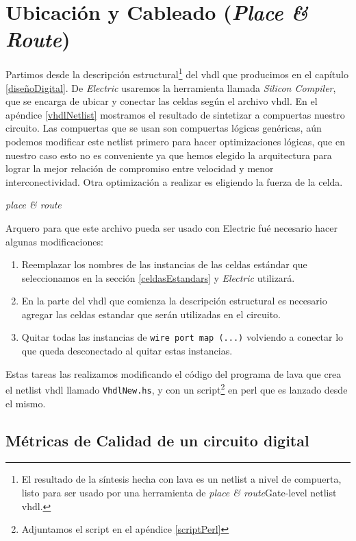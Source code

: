  


\section{Ubicación y Cableado (\emph{Place \& Route})}
Partimos desde la descripción estructural\footnote{El resultado de la síntesis hecha con lava es un netlist a nivel de compuerta, listo para ser usado por una herramienta de \emph{place \& route}Gate-level netlist vhdl.} del vhdl que producimos en el capítulo \ref{diseñoDigital}. De \emph{Electric} usaremos la herramienta llamada \emph{Silicon Compiler}, que se encarga de ubicar y conectar las celdas según el archivo vhdl. En el apéndice \ref{vhdlNetlist} mostramos el resultado de sintetizar a compuertas nuestro circuito. Las compuertas que se usan son compuertas lógicas genéricas, aún podemos modificar este netlist primero para hacer optimizaciones lógicas, que en nuestro caso esto no es conveniente ya que hemos elegido la arquitectura para lograr la mejor relación de compromiso entre velocidad y menor interconectividad. Otra optimización a realizar es eligiendo la fuerza de la celda.



\emph{place \& route}



Arquero para que este archivo pueda ser usado con Electric fué necesario hacer algunas modificaciones:
\begin{enumerate}
\item Reemplazar los nombres de las instancias de las celdas estándar que  seleccionamos en la sección \ref{celdasEstandars} y \emph{Electric} utilizará.
\item En la parte del vhdl que comienza la descripción estructural es necesario agregar las celdas estandar que serán utilizadas en el circuito.
\item Quitar todas las instancias de \verb|wire port map (...)| volviendo a conectar lo que queda desconectado al quitar estas instancias.
\end{enumerate}  
Estas tareas las realizamos modificando el código del programa de lava que crea el netlist vhdl llamado \verb|VhdlNew.hs|, y con un script\footnote{Adjuntamos el script en el apéndice \ref{scriptPerl}} en perl que es lanzado desde el mismo.
\subsection{Métricas de Calidad de un circuito digital}

